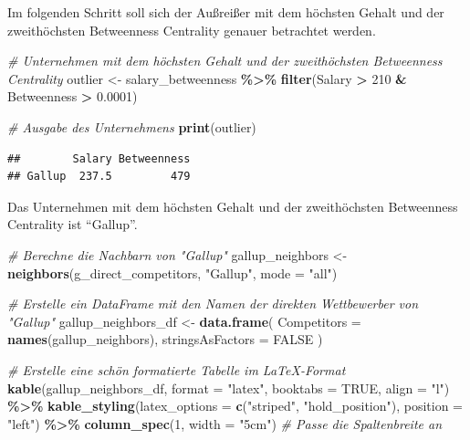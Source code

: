 \documentclass[
]{article}
\newenvironment{Shaded}{\begin{snugshade}}{\end{snugshade}}
\newcommand{\AttributeTok}[1]{\textcolor[rgb]{0.13,0.29,0.53}{#1}}
\newcommand{\CommentTok}[1]{\textcolor[rgb]{0.56,0.35,0.01}{\textit{#1}}}
\newcommand{\ConstantTok}[1]{\textcolor[rgb]{0.56,0.35,0.01}{#1}}
\newcommand{\DecValTok}[1]{\textcolor[rgb]{0.00,0.00,0.81}{#1}}
\newcommand{\FloatTok}[1]{\textcolor[rgb]{0.00,0.00,0.81}{#1}}
\newcommand{\FunctionTok}[1]{\textcolor[rgb]{0.13,0.29,0.53}{\textbf{#1}}}
\newcommand{\NormalTok}[1]{#1}
\newcommand{\OtherTok}[1]{\textcolor[rgb]{0.56,0.35,0.01}{#1}}
\newcommand{\SpecialCharTok}[1]{\textcolor[rgb]{0.81,0.36,0.00}{\textbf{#1}}}
\newcommand{\StringTok}[1]{\textcolor[rgb]{0.31,0.60,0.02}{#1}}
\begin{document}
Im folgenden Schritt soll sich der Außreißer mit dem höchsten Gehalt und
der zweithöchsten Betweenness Centrality genauer betrachtet werden.

\begin{Shaded}
\begin{Highlighting}[]
\CommentTok{\# Unternehmen mit dem höchsten Gehalt und der zweithöchsten Betweenness Centrality}
\NormalTok{outlier }\OtherTok{\textless{}{-}}\NormalTok{ salary\_betweenness }\SpecialCharTok{\%\textgreater{}\%}
  \FunctionTok{filter}\NormalTok{(Salary }\SpecialCharTok{\textgreater{}} \DecValTok{210} \SpecialCharTok{\&}\NormalTok{ Betweenness }\SpecialCharTok{\textgreater{}} \FloatTok{0.0001}\NormalTok{)}

\CommentTok{\# Ausgabe des Unternehmens}
\FunctionTok{print}\NormalTok{(outlier)}
\end{Highlighting}
\end{Shaded}

\begin{verbatim}
##        Salary Betweenness
## Gallup  237.5         479
\end{verbatim}

Das Unternehmen mit dem höchsten Gehalt und der zweithöchsten
Betweenness Centrality ist ``Gallup''.

\begin{Shaded}
\begin{Highlighting}[]
\CommentTok{\# Berechne die Nachbarn von "Gallup"}
\NormalTok{gallup\_neighbors }\OtherTok{\textless{}{-}} \FunctionTok{neighbors}\NormalTok{(g\_direct\_competitors, }\StringTok{"Gallup"}\NormalTok{, }\AttributeTok{mode =} \StringTok{"all"}\NormalTok{)}

\CommentTok{\# Erstelle ein DataFrame mit den Namen der direkten Wettbewerber von "Gallup"}
\NormalTok{gallup\_neighbors\_df }\OtherTok{\textless{}{-}} \FunctionTok{data.frame}\NormalTok{(}
  \AttributeTok{Competitors =} \FunctionTok{names}\NormalTok{(gallup\_neighbors),}
  \AttributeTok{stringsAsFactors =} \ConstantTok{FALSE}
\NormalTok{)}

\CommentTok{\# Erstelle eine schön formatierte Tabelle im LaTeX{-}Format}
\FunctionTok{kable}\NormalTok{(gallup\_neighbors\_df, }\AttributeTok{format =} \StringTok{"latex"}\NormalTok{, }\AttributeTok{booktabs =} \ConstantTok{TRUE}\NormalTok{, }\AttributeTok{align =} \StringTok{"l"}\NormalTok{) }\SpecialCharTok{\%\textgreater{}\%}
  \FunctionTok{kable\_styling}\NormalTok{(}\AttributeTok{latex\_options =} \FunctionTok{c}\NormalTok{(}\StringTok{"striped"}\NormalTok{, }\StringTok{"hold\_position"}\NormalTok{), }\AttributeTok{position =} \StringTok{"left"}\NormalTok{) }\SpecialCharTok{\%\textgreater{}\%}
  \FunctionTok{column\_spec}\NormalTok{(}\DecValTok{1}\NormalTok{, }\AttributeTok{width =} \StringTok{"5cm"}\NormalTok{)  }\CommentTok{\# Passe die Spaltenbreite an}
\end{Highlighting}
\end{Shaded}
\end{document}
